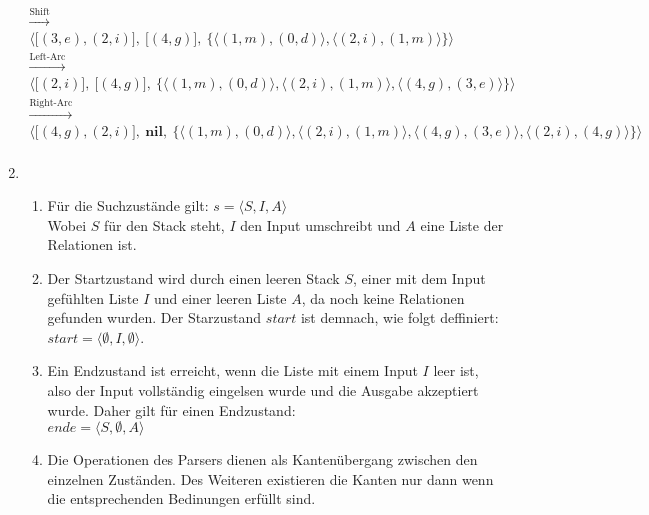 \documentclass[a4paper]{scrartcl}
\begin{document}
\begin{enumerate}
\begin{gather*}
            \xrightarrow{\text{Shift}} \\
            \Big\langle \big[ (3, e), (2, i) \big],\ 
            \big[ (4, g) \big],\ 
            \big\{ \langle (1, m), (0, d) \rangle,
                   \langle (2, i), (1, m) \rangle
            \big \} \Big \rangle \\
            \xrightarrow{\text{Left-Arc}} \\
            \Big\langle \big[ (2, i) \big],\ 
            \big[ (4, g) \big],\ 
            \big\{ \langle (1, m), (0, d) \rangle,
                   \langle (2, i), (1, m) \rangle, 
                   \langle (4, g), (3, e) \rangle
            \big\} \Big\rangle \\
            \xrightarrow{\text{Right-Arc}} \\
            \Big\langle \big[ (4, g), (2, i) \big],\
            \mathbf{nil},\ 
            \big\{ \langle (1, m), (0, d) \rangle,
                   \langle (2, i), (1, m) \rangle,
                   \langle (4, g), (3, e) \rangle,
                   \langle (2, i), (4, g) \rangle
            \big\} \Big\rangle \\
        \end{gather*}
\newpage
    \item
		\begin{enumerate}
			\item
				Für die Suchzustände gilt: $s = \langle S,I,A \rangle$ \\
				Wobei $S$ für den Stack steht, $I$ den Input umschreibt und $A$ eine Liste der Relationen 
				ist.
				
			\item
				Der Startzustand wird durch einen leeren Stack $S$, einer mit dem Input gefühlten Liste
				$I$ und einer leeren Liste $A$, da noch keine Relationen gefunden wurden. Der Starzustand 
				$start$ ist demnach, wie folgt deffiniert: \\ 
				$start = \langle \emptyset,I,\emptyset \rangle$.
				
			\item
				Ein Endzustand ist erreicht, wenn die Liste mit einem Input $I$ leer ist, also der Input 
				vollständig eingelsen wurde und die Ausgabe akzeptiert wurde.
				Daher gilt für einen Endzustand: \\ 
				$ende = \langle S,\emptyset,A \rangle$
				
			\item
				Die Operationen des Parsers dienen als Kantenübergang zwischen den einzelnen Zuständen.
				Des Weiteren existieren die Kanten nur dann wenn die entsprechenden Bedinungen erfüllt 
				sind. \\
				

\end{enumerate}
\end{enumerate}
\end{document}
